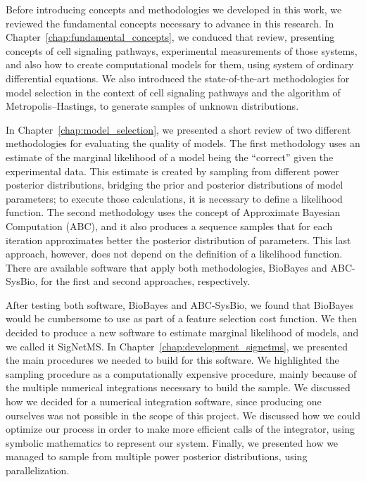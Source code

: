 Before introducing concepts and methodologies we developed in this work,
we reviewed the fundamental concepts necessary to advance in this 
research. In Chapter~\ref{chap:fundamental_concepts}, we conduced that review, presenting concepts
of cell signaling pathways, experimental measurements of those systems, 
and also how to create computational models for them, using system of 
ordinary differential equations. We also introduced the state-of-the-art
methodologies for model selection in the context of cell signaling
pathways and the algorithm of Metropolis--Hastings, to generate samples
of unknown distributions.

In Chapter~\ref{chap:model_selection}, we presented a short review of two different methodologies
for evaluating the quality of models. The first methodology uses an
estimate of the marginal likelihood of a model being the ``correct''
given the experimental data. This estimate is created by sampling from
different power posterior distributions, bridging the prior and
posterior distributions of model parameters; to execute those
calculations, it is necessary to define a likelihood function. The 
second methodology uses the concept of Approximate Bayesian 
Computation (ABC), and it also produces a sequence samples that for each
iteration approximates better the posterior distribution of parameters.
This last approach, however, does not depend on the definition of a
likelihood function. There are available software that apply both
methodologies, BioBayes and ABC-SysBio, for the first and second
approaches, respectively.

After testing both software, BioBayes and ABC-SysBio, we found that
BioBayes would be cumbersome to use as part of a feature selection cost
function. We then decided to produce a new software to estimate marginal
likelihood of models, and we called it SigNetMS. In Chapter~\ref{chap:development_signetms}, we
presented the main procedures we needed to build for this software. We
highlighted the sampling procedure as a computationally expensive
procedure, mainly because of the multiple numerical integrations
necessary to build the sample. We discussed how we decided for a
numerical integration software, since producing one ourselves was not
possible in the scope of this project. We discussed how we could
optimize our process in order to make more efficient calls of the
integrator, using symbolic mathematics to represent our system. Finally,
we presented how we managed to sample from multiple power posterior
distributions, using parallelization.

